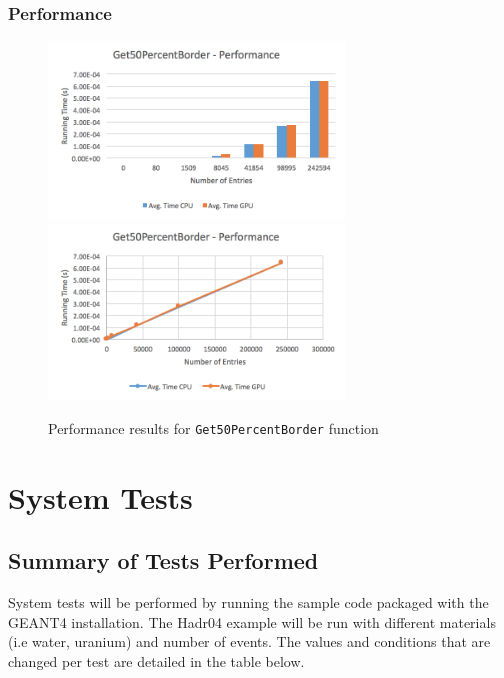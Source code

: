 \documentclass[12pt]{article}
\begin{document}
	\subsubsection{Performance}
		\begin{figure}[H]
    	\centering
    	\caption{Performance results for \texttt{Get50PercentBorder} function}\label{figPerformanceGet50Percent}
    	\includegraphics[width=0.7\textwidth]{get50_bar.png}
    	\includegraphics[width=0.7\textwidth]{get50_line.png}
    	\end{figure}
		
\section{System Tests}
\subsection{Summary of Tests Performed}
System tests will be performed by running the sample code packaged with the GEANT4 installation. The Hadr04 example will be run with different materials (i.e water, uranium) and number of events. The values and conditions that are changed per test are detailed in the table below.\\ \\
\end{document}
